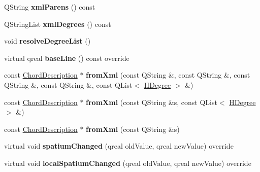 \begin{DoxyCompactItemize}
\item 
\mbox{\label{class_ms_1_1_harmony_a3f5f8782791e6241e62bc670c15cfe6e}} 
Q\+String {\bfseries xml\+Parens} () const
\item 
\mbox{\label{class_ms_1_1_harmony_a636997d3f62878fd2e88c0bd9d4f0977}} 
Q\+String\+List {\bfseries xml\+Degrees} () const
\item 
\mbox{\label{class_ms_1_1_harmony_a24447627db0c171fcd78093a98c07b69}} 
void {\bfseries resolve\+Degree\+List} ()
\item 
\mbox{\label{class_ms_1_1_harmony_a56cda2517f5e2a04909835145c1b3a75}} 
virtual qreal {\bfseries base\+Line} () const override
\item 
\mbox{\label{class_ms_1_1_harmony_ab6eed1493b91da8b0907abab85671106}} 
const \hyperlink{struct_ms_1_1_chord_description}{Chord\+Description} $\ast$ {\bfseries from\+Xml} (const Q\+String \&, const Q\+String \&, const Q\+String \&, const Q\+String \&, const Q\+List$<$ \hyperlink{class_ms_1_1_h_degree}{H\+Degree} $>$ \&)
\item 
\mbox{\label{class_ms_1_1_harmony_a34fe9faefb327a8067e3bde11cbca890}} 
const \hyperlink{struct_ms_1_1_chord_description}{Chord\+Description} $\ast$ {\bfseries from\+Xml} (const Q\+String \&s, const Q\+List$<$ \hyperlink{class_ms_1_1_h_degree}{H\+Degree} $>$ \&)
\item 
\mbox{\label{class_ms_1_1_harmony_a39f7be791793227c56a1db3620b52639}} 
const \hyperlink{struct_ms_1_1_chord_description}{Chord\+Description} $\ast$ {\bfseries from\+Xml} (const Q\+String \&s)
\item 
\mbox{\label{class_ms_1_1_harmony_a87ad1e39976e88a162fa50adf1abdb8f}} 
virtual void {\bfseries spatium\+Changed} (qreal old\+Value, qreal new\+Value) override
\item 
\mbox{\label{class_ms_1_1_harmony_a419433930344798627a40a9cf47430f7}} 
virtual void {\bfseries local\+Spatium\+Changed} (qreal old\+Value, qreal new\+Value) override

\end{DoxyCompactItemize}

